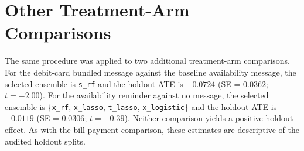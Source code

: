 \documentclass[12pt]{article}
\newcommand{\DebitSelected}{\texttt{s\_rf}}
\newcommand{\DebitHOATE}{-0.0724}
\newcommand{\DebitHOSE}{0.0362}
\newcommand{\DebitHOT}{-2.00}
\newcommand{\FauseSelected}{\{\texttt{x\_rf}, \texttt{x\_lasso}, \texttt{t\_lasso}, \texttt{x\_logistic}\}}
\newcommand{\FauseHOATE}{-0.0119}
\newcommand{\FauseHOSE}{0.0306}
\newcommand{\FauseHOT}{-0.39}
\begin{document}
\section{Other Treatment-Arm Comparisons}
\label{supp:other_treatment_arms}

The same procedure was applied to two additional treatment-arm comparisons. For the debit-card bundled message against the baseline availability message, the selected ensemble is \DebitSelected{} and the holdout ATE is $\DebitHOATE$ (SE = $\DebitHOSE$; $t=\DebitHOT$). For the availability reminder against no message, the selected ensemble is \FauseSelected{} and the holdout ATE is $\FauseHOATE$ (SE = $\FauseHOSE$; $t=\FauseHOT$). Neither comparison yields a positive holdout effect. As with the bill-payment comparison, these estimates are descriptive of the audited holdout splits.

\begingroup{}

\endgroup
\end{document}
